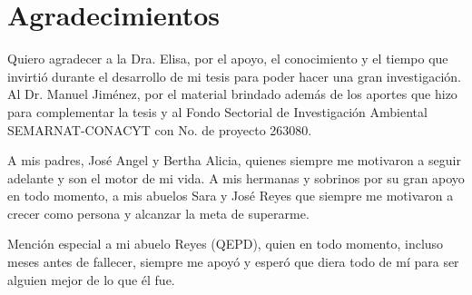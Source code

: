 
\chapter{Agradecimientos}

Quiero agradecer a la Dra. Elisa, por el apoyo, el conocimiento y el tiempo que invirtió durante el desarrollo de mi tesis para poder hacer una gran investigación. Al Dr. Manuel Jiménez, por el material brindado además de los aportes que hizo para complementar la tesis y al Fondo Sectorial de Investigación Ambiental SEMARNAT-CONACYT con No. de proyecto 263080.

A mis padres, José Angel y Bertha Alicia, quienes siempre me motivaron a seguir adelante y son el motor de mi vida. A mis hermanas y sobrinos por su gran apoyo en todo momento, a mis abuelos Sara y José Reyes que siempre me motivaron a crecer como persona y alcanzar la meta de superarme.

Mención especial a mi abuelo Reyes (QEPD), quien en todo momento, incluso meses antes de fallecer, siempre me apoyó y esperó que diera todo de mí para ser alguien mejor de lo que él fue.

